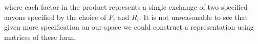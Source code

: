 \documentclass[10pt]{ucthesis}
\begin{document}
where each factor in the product represents a single exchange of two specified anyons specified by the choice of $F_i$ and $R_i$. It is not unreasonable to see that given more specification on our space we could construct a representation using matrices of these form.






















\clearpage

%
%




\end{document}
